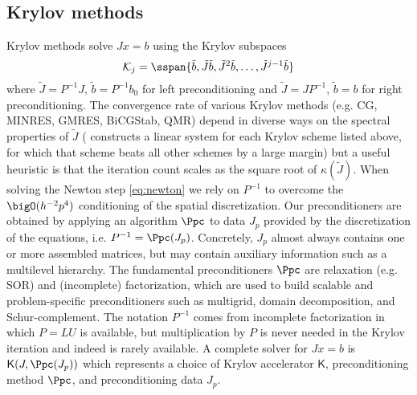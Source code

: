 \subsection{Krylov methods}\label{sec:jfnk:krylov}
Krylov methods solve $J x = b$ using the Krylov subspaces
\begin{equation*}
  \mathcal K_j = \sspan \{\tilde b,\tilde{J} \tilde b, \tilde J^2 \tilde b, \dotsc, \tilde J^{j-1}\tilde b \}
\end{equation*}
where $\tilde J = P^{-1}J$, $\tilde b = P^{-1}b_0$ for left preconditioning and $\tilde J = J P^{-1}$, $\tilde b = b$
for right preconditioning.  The convergence rate of various Krylov methods (e.g. CG, MINRES, GMRES, BiCGStab, QMR)
depend in diverse ways on the spectral properties of $\tilde J$ (\eg \citet{nachtigal1992fnm} constructs a linear system
for each Krylov scheme listed above, for which that scheme beats all other schemes by a large margin)
but a useful heuristic is that the iteration count scales as
the square root of $\kappa(\tilde J)$.  When solving the Newton step \eqref{eq:newton} we rely on $P^{-1}$ to overcome
the $\bigO(h^{-2}p^4)$ conditioning of the spatial discretization.  Our preconditioners are obtained by applying an
algorithm $\Ppc$ to data $J_p$ provided by the discretization of the equations, i.e. $P^{-1} = \Ppc(J_p)$.  Concretely,
$J_p$ almost always contains one or more assembled matrices, but may contain auxiliary information such as a multilevel
hierarchy.  The fundamental preconditioners $\Ppc$ are relaxation (e.g. SOR) and (incomplete) factorization, which are
used to build scalable and problem-specific preconditioners such as multigrid, domain decomposition, and
Schur-complement.  The notation $P^{-1}$ comes from incomplete factorization in which $P = LU$ is available, but
multiplication by $P$ is never needed in the Krylov iteration and indeed is rarely available.  A complete solver for $J
x = b$ is $\mathsf K(J,\Ppc(J_p))$ which represents a choice of Krylov accelerator $\mathsf K$, preconditioning method $\Ppc$, and
preconditioning data $J_p$.


